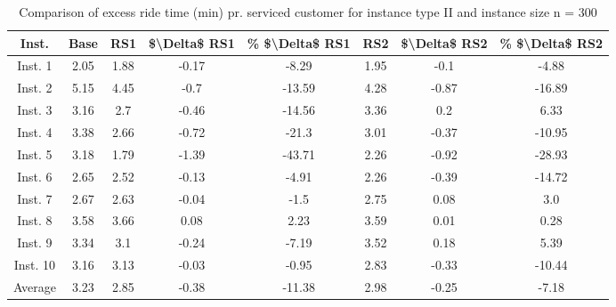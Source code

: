 \begin{table}[H]
\centering
\begin{tabular}{cccccccc}
  \hline
  \textbf{Inst.} & \textbf{Base} & \textbf{RS1} & \textbf{\$\textbackslash{}Delta\$  RS1} & \textbf{\% \$\textbackslash{}Delta\$  RS1} & \textbf{RS2} & \textbf{\$\textbackslash{}Delta\$  RS2} & \textbf{\% \$\textbackslash{}Delta\$  RS2} \\\hline
  Inst. 1 & 2.05 & 1.88 & -0.17 & -8.29 & 1.95 & -0.1 & -4.88 \\
  Inst. 2 & 5.15 & 4.45 & -0.7 & -13.59 & 4.28 & -0.87 & -16.89 \\
  Inst. 3 & 3.16 & 2.7 & -0.46 & -14.56 & 3.36 & 0.2 & 6.33 \\
  Inst. 4 & 3.38 & 2.66 & -0.72 & -21.3 & 3.01 & -0.37 & -10.95 \\
  Inst. 5 & 3.18 & 1.79 & -1.39 & -43.71 & 2.26 & -0.92 & -28.93 \\
  Inst. 6 & 2.65 & 2.52 & -0.13 & -4.91 & 2.26 & -0.39 & -14.72 \\
  Inst. 7 & 2.67 & 2.63 & -0.04 & -1.5 & 2.75 & 0.08 & 3.0 \\
  Inst. 8 & 3.58 & 3.66 & 0.08 & 2.23 & 3.59 & 0.01 & 0.28 \\
  Inst. 9 & 3.34 & 3.1 & -0.24 & -7.19 & 3.52 & 0.18 & 5.39 \\
  Inst. 10 & 3.16 & 3.13 & -0.03 & -0.95 & 2.83 & -0.33 & -10.44 \\
  Average & 3.23 & 2.85 & -0.38 & -11.38 & 2.98 & -0.25 & -7.18 \\\hline
\end{tabular}
\caption{Comparison of excess ride time (min) pr. serviced customer for instance type II and instance size n = 300}
\label{tab:wait:resrelocation-excess-ride-time-comparison_II_300}
\end{table}
